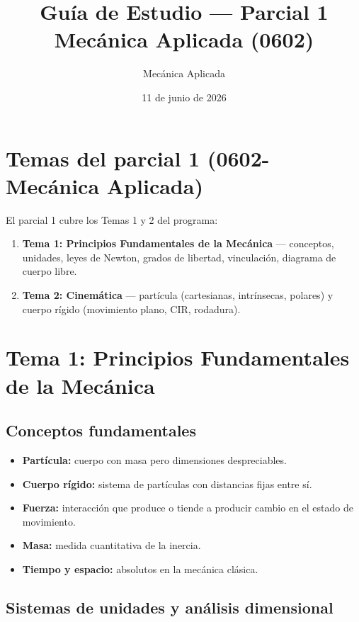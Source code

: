 \documentclass[12pt,a4paper]{article}
\title{Guía de Estudio --- Parcial 1\\Mecánica Aplicada (0602)}
\author{Mecánica Aplicada}
\date{11 de junio de 2026}
\begin{document}
\maketitle

\section*{Temas del parcial 1 (0602-Mecánica Aplicada)}

El parcial 1 cubre los Temas 1 y 2 del programa:

\begin{enumerate}
    \item \textbf{Tema 1: Principios Fundamentales de la Mecánica}
          --- conceptos, unidades, leyes de Newton, grados de libertad,
          vinculación, diagrama de cuerpo libre.
    \item \textbf{Tema 2: Cinemática}
          --- partícula (cartesianas, intrínsecas, polares) y
          cuerpo rígido (movimiento plano, CIR, rodadura).
\end{enumerate}

\newpage

\section{Tema 1: Principios Fundamentales de la Mecánica}

\subsection{Conceptos fundamentales}

\begin{itemize}
    \item \textbf{Partícula:} cuerpo con masa pero dimensiones despreciables.
    \item \textbf{Cuerpo rígido:} sistema de partículas con distancias fijas entre sí.
    \item \textbf{Fuerza:} interacción que produce o tiende a producir cambio en el
          estado de movimiento.
    \item \textbf{Masa:} medida cuantitativa de la inercia.
    \item \textbf{Tiempo y espacio:} absolutos en la mecánica clásica.
\end{itemize}

\subsection{Sistemas de unidades y análisis dimensional}
\end{document}
